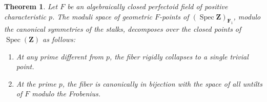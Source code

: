 \documentclass[11pt,a4paper]{article}
\newtheorem{theorem}{Theorem}[section]
\newcommand{\Z}{\mathbf{Z}}
\def\spzf{(\Spec \Z)_{\mathbf{F}_{1}}}
\newcommand{\Spec}{\operatorname{Spec}}
\begin{document}
\begin{theorem}\label{scholze_heuristic}
Let $F$ be an algebraically closed perfectoid field of positive characteristic $p$. The moduli space of geometric $F$-points of $\spzf$, modulo the canonical symmetries of the stalks, decomposes over the closed points of $\Spec(\Z)$ as follows:
\begin{enumerate}
    \item At any prime different from $p$, the fiber rigidly collapses to a single trivial point.
    \item At the prime $p$, the fiber is canonically in bijection with the space of all untilts of $F$ modulo the Frobenius.
\end{enumerate}
\end{theorem}
\end{document}

